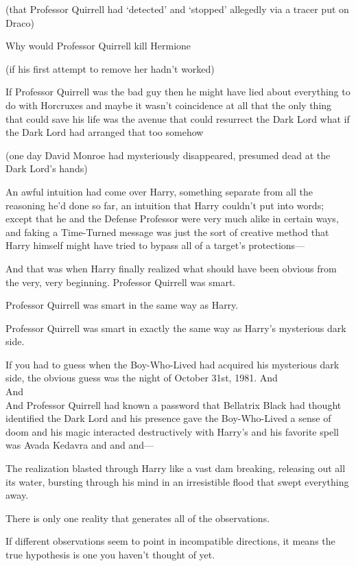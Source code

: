 (that Professor Quirrell had `detected' and `stopped' allegedly via a tracer
put on Draco)

Why would Professor Quirrell kill Hermione

(if his first attempt to remove her hadn't worked)

If Professor Quirrell was the bad guy then he might have lied about everything
to do with Horcruxes and maybe it wasn't coincidence at all that the only thing
that could save his life was the avenue that could resurrect the Dark Lord what
if the Dark Lord had arranged that too somehow

(one day David Monroe had mysteriously disappeared, presumed dead at the Dark
Lord's hands)

An awful intuition had come over Harry, something separate from all the
reasoning he'd done so far, an intuition that Harry couldn't put into words;
except that he and the Defense Professor were very much alike in certain ways,
and faking a Time-Turned message was just the sort of creative method that
Harry himself might have tried to bypass all of a target's protections---

And that was when Harry finally realized what should have been obvious from the
very, very beginning.
\sbreak
Professor Quirrell was smart.

Professor Quirrell was smart in the same way as Harry.

Professor Quirrell was smart in exactly the same way as Harry's mysterious dark
side.

If you had to guess when the Boy-Who-Lived had acquired his mysterious dark
side, the obvious guess was the night of October 31st, 1981.
\sbreak
And\\
And\\
And Professor Quirrell had known a password that Bellatrix Black had thought
identified the Dark Lord and his presence gave the Boy-Who-Lived a sense of
doom and his magic interacted destructively with Harry's and his favorite spell
was Avada Kedavra and and and---

The realization blasted through Harry like a vast dam breaking, releasing out
all its water, bursting through his mind in an irresistible flood that swept
everything away.

There is only one reality that generates all of the observations.

If different observations seem to point in incompatible directions, it means
the true hypothesis is one you haven't thought of yet.

